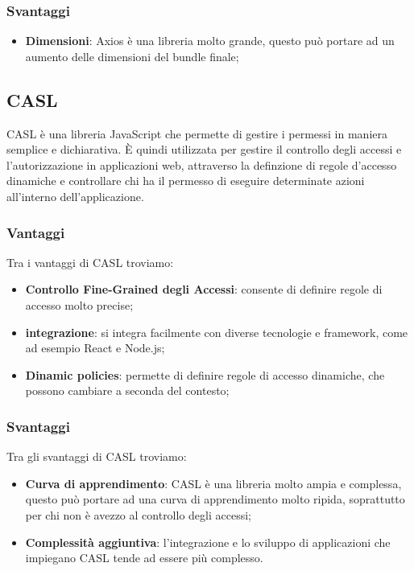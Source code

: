 \subsubsection*{Svantaggi}
\begin{itemize}
    \item \textbf{Dimensioni}: Axios è una libreria molto grande, questo può portare ad un aumento delle dimensioni del bundle finale;
\end{itemize}


\subsection*{CASL}
CASL è una libreria JavaScript che permette di gestire i permessi in maniera semplice
e dichiarativa. È quindi utilizzata per gestire il controllo degli accessi e l'autorizzazione in applicazioni web, attraverso la definzione di regole d'accesso dinamiche e controllare chi ha il permesso di eseguire determinate azioni all'interno dell'applicazione.

\subsubsection*{Vantaggi}
Tra i vantaggi di CASL troviamo:
\begin{itemize}
    \item \textbf{Controllo Fine-Grained degli Accessi}: consente di definire regole di accesso molto precise;
    \item \textbf{integrazione}: si integra facilmente con diverse tecnologie e framework, come ad esempio React e Node.js;
    \item \textbf{Dinamic policies}: permette di definire regole di accesso dinamiche, che possono cambiare a seconda del contesto;
\end{itemize}

\subsubsection*{Svantaggi}
Tra gli svantaggi di CASL troviamo:
\begin{itemize}
    \item \textbf{Curva di apprendimento}: CASL è una libreria molto ampia e complessa, questo può portare ad una curva di apprendimento molto ripida, soprattutto per chi non è avezzo al controllo degli accessi;
    \item \textbf{Complessità aggiuntiva}: l'integrazione e lo sviluppo di applicazioni che impiegano CASL tende ad essere più complesso.
\end{itemize}


